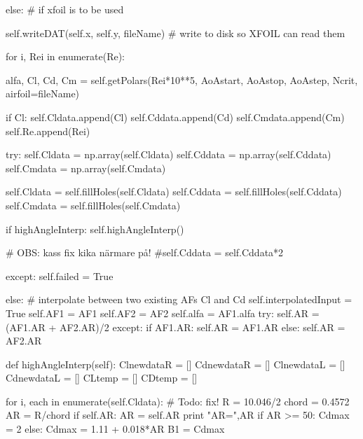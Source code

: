\begin{pythoncode}
            else: # if xfoil is to be used

                self.writeDAT(self.x, self.y, fileName) # write to disk so XFOIL can read them
                
                for i, Rei in enumerate(Re): 
                    
                    alfa, Cl, Cd, Cm = self.getPolars(Rei*10**5, 
                                                      AoAstart, 
                                                      AoAstop, 
                                                      AoAstep, 
                                                      Ncrit,
                                                      airfoil=fileName)
                    
                    if Cl:
                        self.Cldata.append(Cl)
                        self.Cddata.append(Cd)
                        self.Cmdata.append(Cm)
                        self.Re.append(Rei)

            try:
                self.Cldata = np.array(self.Cldata)
                self.Cddata = np.array(self.Cddata)
                self.Cmdata = np.array(self.Cmdata)

                self.Cldata = self.fillHoles(self.Cldata)
                self.Cddata = self.fillHoles(self.Cddata)
                self.Cmdata = self.fillHoles(self.Cmdata)

                if highAngleInterp:
                    self.highAngleInterp()
                    
                # OBS: kass fix kika närmare på!
                #self.Cddata = self.Cddata*2

            except:
                self.failed = True
            
        else: # interpolate between two existing AFs Cl and Cd
            self.interpolatedInput = True
            self.AF1 = AF1
            self.AF2 = AF2
            self.alfa = AF1.alfa
            try:
                self.AR = (AF1.AR + AF2.AR)/2
            except:
                if AF1.AR:
                    self.AR = AF1.AR
                else:
                    self.AR = AF2.AR


    def highAngleInterp(self):
        ClnewdataR = []
        CdnewdataR = []
        ClnewdataL = []
        CdnewdataL = []
        CLtemp = []
        CDtemp = []

        for i, each in enumerate(self.Cldata):
            # Todo: fix!
            R = 10.046/2
            chord = 0.4572
            AR = R/chord
            if self.AR:
                AR = self.AR
            print "AR=",AR
            if AR >= 50:
                Cdmax = 2
            else:
                Cdmax = 1.11 + 0.018*AR
            B1 = Cdmax


\end{pythoncode}
